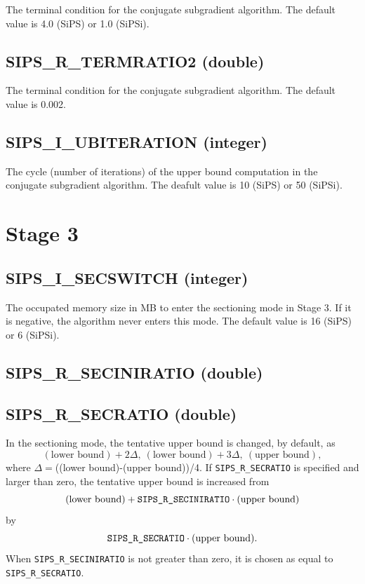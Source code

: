 \documentclass[a4paper]{book}
\begin{document}
The terminal condition for the conjugate subgradient algorithm.
The default value is 4.0 (SiPS) or 1.0 (SiPSi).

\hypertarget{TERMRATIO2}{%
\subsection{SIPS\_R\_TERMRATIO2 (double)}
}

The terminal condition for the conjugate subgradient algorithm.
The default value is 0.002.

\hypertarget{UBITERATION}{%
\subsection{SIPS\_I\_UBITERATION (integer)}
}

The cycle (number of iterations) of the upper bound computation in the conjugate subgradient algorithm.
The deafult value is 10 (SiPS) or 50 (SiPSi).

\section{Stage 3}

\hypertarget{SECSWITCH}{%
\subsection{SIPS\_I\_SECSWITCH (integer)}
}

The occupated memory size in MB to enter the sectioning mode in Stage 3.
If it is negative, the algorithm never enters this mode.
The default value is 16 (SiPS) or 6 (SiPSi).

\hypertarget{SECINIRATIO}{%
\subsection{SIPS\_R\_SECINIRATIO (double)}
}

\hypertarget{SECRATIO}{%
\subsection{SIPS\_R\_SECRATIO (double)}
}

In the sectioning mode, the tentative upper bound is changed, by default, as
\begin{displaymath}
  (\mbox{lower\ bound})+2\Delta,~ (\mbox{lower\ bound})+3\Delta,~
  (\mbox{upper bound}),
\end{displaymath}
where $\Delta=$((lower bound)-(upper bound))/4.
If \verb+SIPS_R_SECRATIO+ is specified and larger than zero, the tentative upper bound is increased from 
\begin{displaymath}
  (\mbox{lower\ bound})+\verb+SIPS_R_SECINIRATIO+\cdot(\mbox{upper bound})
\end{displaymath}
by
\begin{displaymath}
 \verb+SIPS_R_SECRATIO+\cdot(\mbox{upper\ bound}).
\end{displaymath}
When \verb+SIPS_R_SECINIRATIO+ is not greater than zero, it is chosen as equal to \verb+SIPS_R_SECRATIO+.
\end{document}
